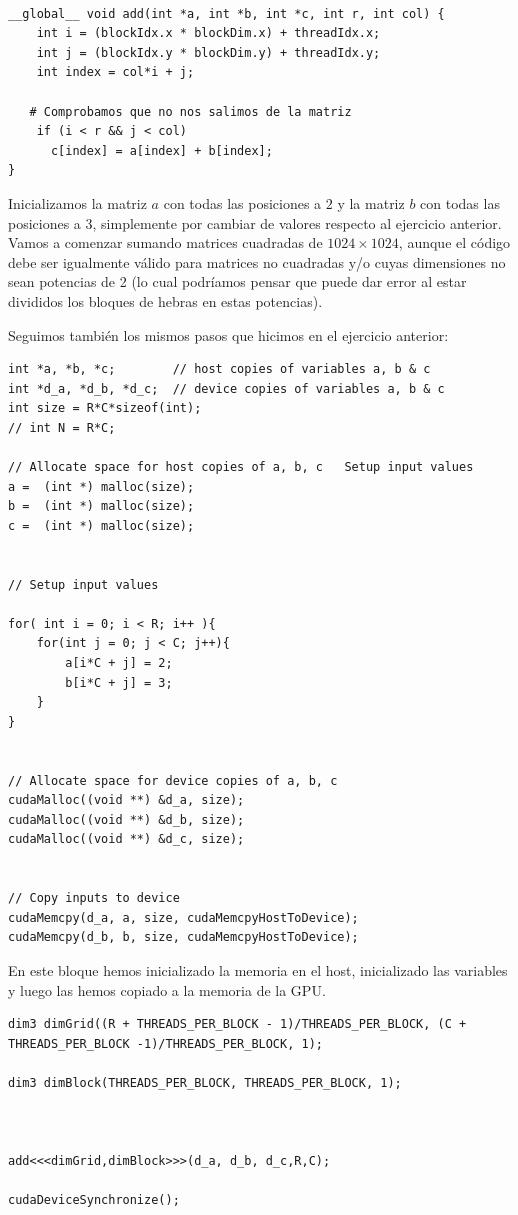 \documentclass[11pt]{article}
\theoremstyle{plain}
\begin{document}
\begin{verbatim}

__global__ void add(int *a, int *b, int *c, int r, int col) {
    int i = (blockIdx.x * blockDim.x) + threadIdx.x;
    int j = (blockIdx.y * blockDim.y) + threadIdx.y;
    int index = col*i + j;

   # Comprobamos que no nos salimos de la matriz
    if (i < r && j < col)
      c[index] = a[index] + b[index];
}
\end{verbatim}

Inicializamos la matriz $a$ con todas las posiciones a $2$ y la matriz $b$ con todas las posiciones a $3$, simplemente por cambiar de valores respecto al ejercicio anterior. Vamos a comenzar sumando matrices cuadradas de $1024\times 1024$, aunque el código debe ser igualmente válido para matrices no cuadradas y/o cuyas dimensiones no sean potencias de 2 (lo cual podríamos pensar que puede dar error al estar divididos los bloques de hebras en estas potencias).

Seguimos también los mismos pasos que hicimos en el ejercicio anterior:
\begin{verbatim}
int *a, *b, *c;        // host copies of variables a, b & c
int *d_a, *d_b, *d_c;  // device copies of variables a, b & c
int size = R*C*sizeof(int);
// int N = R*C;

// Allocate space for host copies of a, b, c   Setup input values
a =  (int *) malloc(size);
b =  (int *) malloc(size);
c =  (int *) malloc(size);


// Setup input values

for( int i = 0; i < R; i++ ){
    for(int j = 0; j < C; j++){
        a[i*C + j] = 2;
        b[i*C + j] = 3;
    }
}


// Allocate space for device copies of a, b, c
cudaMalloc((void **) &d_a, size);
cudaMalloc((void **) &d_b, size);
cudaMalloc((void **) &d_c, size);


// Copy inputs to device
cudaMemcpy(d_a, a, size, cudaMemcpyHostToDevice);
cudaMemcpy(d_b, b, size, cudaMemcpyHostToDevice);
\end{verbatim}

En este bloque hemos inicializado la memoria en el host, inicializado las variables y luego las hemos copiado a la memoria de la GPU.

\begin{verbatim}
dim3 dimGrid((R + THREADS_PER_BLOCK - 1)/THREADS_PER_BLOCK, (C + THREADS_PER_BLOCK -1)/THREADS_PER_BLOCK, 1);

dim3 dimBlock(THREADS_PER_BLOCK, THREADS_PER_BLOCK, 1);



add<<<dimGrid,dimBlock>>>(d_a, d_b, d_c,R,C);

cudaDeviceSynchronize();
\end{verbatim}
\end{document}
